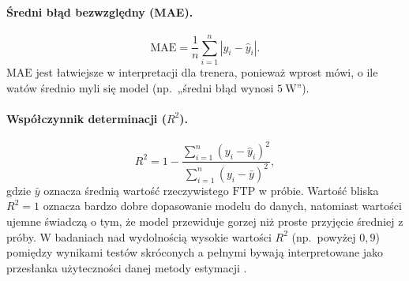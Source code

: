 \paragraph{Średni błąd bezwzględny (MAE).}
\begin{equation}
\label{eq:mae}
\mathrm{MAE} = \frac{1}{n}\sum_{i=1}^{n}\left|y_i - \hat{y}_i\right|.
\end{equation}
$\mathrm{MAE}$ jest łatwiejsze w interpretacji dla trenera, ponieważ wprost mówi, o ile watów średnio myli się model (np.\ „średni błąd wynosi $5\ \mathrm{W}$”).

\paragraph{Współczynnik determinacji ($R^2$).}
\begin{equation}
\label{eq:r2}
R^2 = 1 - \frac{\sum_{i=1}^{n}\left(y_i - \hat{y}_i\right)^2}{\sum_{i=1}^{n}\left(y_i - \bar{y}\right)^2},
\end{equation}
gdzie $\bar{y}$ oznacza średnią wartość rzeczywistego $\mathrm{FTP}$ w próbie.
Wartość bliska $R^2 = 1$ oznacza bardzo dobre dopasowanie modelu do danych, natomiast wartości ujemne świadczą o tym, że model przewiduje gorzej niż proste przyjęcie średniej z próby.
W badaniach nad wydolnością wysokie wartości $R^2$ (np.\ powyżej $0{,}9$) pomiędzy wynikami testów skróconych a pełnymi bywają interpretowane jako przesłanka użyteczności danej metody estymacji \parencite{karsten2021cpftp}.
